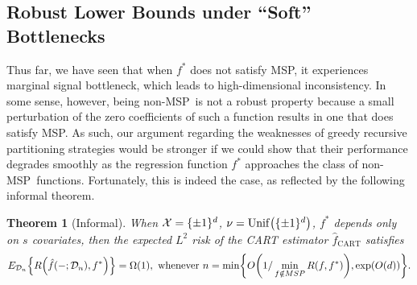 \documentclass[11pt]{article}
\newtheorem{theorem}{Theorem}[section]
\newtheorem{proposition}[theorem]{Proposition}
\newcommand{\bx}{\mathbf{x}}
\DeclarePairedDelimiter{\braces}{\lbrace}{\rbrace}
\DeclarePairedDelimiter{\paren}{(}{)}
\newcommand{\E}{\mathbb{E}}
\renewcommand{\xspace}{\mathcal{X}}
\newcommand{\binspace}{\braces{\pm 1}^\nfeats}
\newcommand{\xmeasure}{\nu}
\newcommand{\sparsity}{s}
\newcommand{\nfeats}{d}
\newcommand{\nsamples}{n}
\newcommand{\data}[1][n]{\mathcal{D}_{#1}}
\newcommand{\jk}[1]{{\color{orange}[JK: #1]}}
\newcommand{\MSP}{\textsf{MSP}}
\newcommand{\frf}{\hat{f}_{\operatorname{RF}}}
\newcommand{\fcart}{\hat{f}_{\operatorname{CART}}}
\begin{document}

\subsection{Robust Lower Bounds under ``Soft'' Bottlenecks}

Thus far, we have seen that when $f^*$ does not satisfy \MSP, it experiences marginal signal bottleneck, which leads to high-dimensional inconsistency.
In some sense, however, being non-\MSP~is not a robust property because a small perturbation of the zero coefficients of such a function results in one that does satisfy \MSP.
As such, our argument regarding the weaknesses of greedy recursive partitioning strategies would be stronger if we could show that their performance degrades smoothly as the regression function $f^*$ approaches the class of non-\MSP~functions.
Fortunately, this is indeed the case, as reflected by the following informal theorem.

\begin{theorem}[Informal]
    When $\xspace = \binspace$, $\xmeasure = \operatorname{Unif}\paren*{\binspace}$, $f^*$ depends only on $\sparsity$ covariates, then the expected $L^2$ risk of the CART estimator $\fcart$ satisfies 
    \begin{align*}
    E_{\data}\braces*{ R\paren*{\hat f(-;\data),f^*}} = \Omega(1),~\text{whenever}~\nsamples = \min\braces*{O\paren*{1/\min_{f\notin\MSP}R(f, f^*)},\exp(O(\nfeats))}.
    \end{align*}
\end{theorem}

\end{document}

